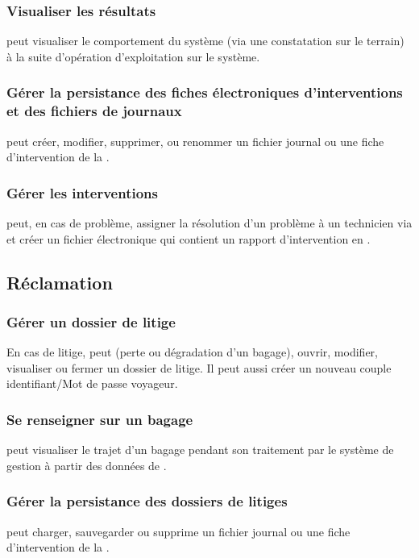 \subsubsection{Visualiser les résultats}
 peut visualiser le comportement du système (via une constatation sur le terrain) à la suite d'opération d'exploitation sur le système.

\subsubsection{Gérer la persistance des fiches électroniques d'interventions et des fichiers de journaux}
 peut créer, modifier, supprimer, ou renommer un fichier journal ou une fiche d'intervention de la .

\subsubsection{Gérer les interventions}
 peut, en cas de problème, assigner la résolution d'un problème à un technicien via  et créer un fichier électronique qui contient un rapport d'intervention en .

\subsection{Réclamation}
\subsubsection{Gérer un dossier de litige}
En cas de litige,   peut (perte ou dégradation d'un bagage), ouvrir, modifier, visualiser ou fermer un dossier de litige. Il peut aussi créer un nouveau couple identifiant/Mot de passe voyageur.

\subsubsection	{Se renseigner sur un bagage}
 peut visualiser le trajet d'un bagage pendant son traitement par le système de gestion à partir des données de .

\subsubsection{Gérer la persistance des dossiers de litiges}
 peut charger, sauvegarder ou supprime un fichier journal ou une fiche d'intervention de la .

